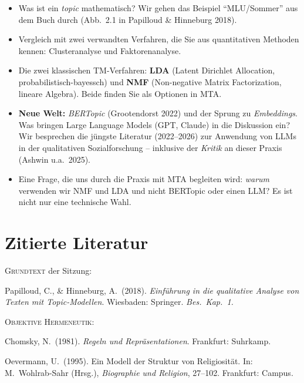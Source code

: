 \documentclass[a4paper,11pt]{article}
\begin{document}
\begin{itemize}
\item Was ist ein \emph{topic} mathematisch? Wir gehen das
Beispiel \enquote{MLU/Sommer} aus dem Buch durch (Abb.~2.1 in
Papilloud \& Hinneburg 2018).

\item Vergleich mit zwei verwandten Verfahren, die Sie aus
quantitativen Methoden kennen: Clusteranalyse und Faktorenanalyse.

\item Die zwei klassischen TM-Verfahren: \textbf{LDA} (Latent
Dirichlet Allocation, probabilistisch-bayessch) und \textbf{NMF}
(Non-negative Matrix Factorization, lineare Algebra). Beide
finden Sie als Optionen in MTA.

\item \textbf{Neue Welt:} \emph{BERTopic} (Grootendorst 2022) und
der Sprung zu \emph{Embeddings}. Was bringen Large Language Models
(GPT, Claude) in die Diskussion ein? Wir besprechen die jüngste
Literatur (2022--2026) zur Anwendung von LLMs in der qualitativen
Sozialforschung -- inklusive der \emph{Kritik} an dieser Praxis
(Ashwin u.a.\ 2025).

\item Eine Frage, die uns durch die Praxis mit MTA begleiten wird:
\emph{warum} verwenden wir NMF und LDA und nicht BERTopic oder
einen LLM? Es ist nicht nur eine technische Wahl.
\end{itemize}

\section*{Zitierte Literatur}

\footnotesize

\textsc{Grundtext} der Sitzung:

Papilloud, C., \& Hinneburg, A.\ (2018). \emph{Einführung in die
qualitative Analyse von Texten mit Topic-Modellen}. Wiesbaden:
Springer. \emph{Bes.\ Kap.~1.}

\bigskip

\textsc{Objektive Hermeneutik:}

Chomsky, N.\ (1981). \emph{Regeln und Repräsentationen}. Frankfurt:
Suhrkamp.

Oevermann, U.\ (1995). Ein Modell der Struktur von Religiosität.
In: M.\ Wohlrab-Sahr (Hrsg.), \emph{Biographie und Religion},
27--102. Frankfurt: Campus.
\end{document}
